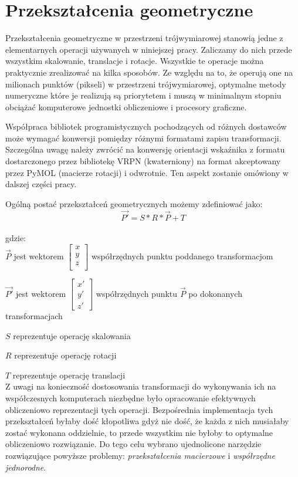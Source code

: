 \documentclass[licencjacka]{pracamgr}
\begin{document}
\section{Przekształcenia geometryczne}
Przekształcenia geometryczne w przestrzeni trójwymiarowej stanowią jedne z elementarnych operacji używanych w niniejszej pracy. Zaliczamy do nich przede wszystkim skalowanie, translacje i rotacje. Wszystkie te operacje można praktycznie zrealizować na kilka sposobów. Ze względu na to, że operują one na milionach punktów (pikseli) w przestrzeni trójwymiarowej, optymalne metody numeryczne które je realizują są priorytetem i muszą w minimalnym stopniu obciążać komputerowe jednostki obliczeniowe i procesory graficzne. 

Współpraca bibliotek programistycznych pochodzących od różnych dostawców może wymagać konwersji pomiędzy różnymi formatami zapisu transformacji. Szczególna uwagę należy zwrócić na konwersję orientacji wskaźnika z formatu dostarczonego przez bibliotekę VRPN (kwaterniony) na format akceptowany przez PyMOL (macierze rotacji) i odwrotnie. Ten aspekt zostanie omówiony w dalszej części pracy.

Ogólną postać przekształceń geometrycznych możemy zdefiniować jako:
$$
\vec{P'}=S*R*\vec{P}+T
$$
\\
gdzie:
\\

$\vec{P}$ jest wektorem $\begin{bmatrix} x \\y \\z \\ \end{bmatrix}$ współrzędnych punktu poddanego transformacjom

$\vec{P'}$ jest wektorem $\begin{bmatrix} x'\\ y'\\ z' \end{bmatrix} $ współrzędnych punktu $\vec{P}$ po dokonanych transformacjach

$S$ reprezentuje operację skalowania

$R$ reprezentuje operację rotacji

$T$ reprezentuje operację translacji
\\

Z uwagi na konieczność dostosowania transformacji do wykonywania ich na współczesnych komputerach niezbędne było opracowanie efektywnych obliczeniowo reprezentacji tych operacji. Bezpośrednia implementacja tych przekształceń byłaby dość kłopotliwa gdyż nie dość, że każda z nich musiałaby zostać wykonana oddzielnie, to przede wszystkim nie byłoby to optymalne obliczeniowo rozwiązanie. Do tego celu wybrano ujednolicone narzędzie rozwiązujące powyższe problemy: \textit{przekształcenia macierzowe} i \textit{współrzędne jednorodne}.
\end{document}
